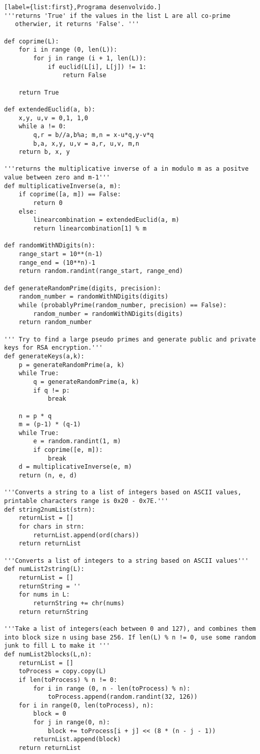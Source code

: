 \documentclass[a4paper,11pt]{article}
\theoremstyle{mytheor}
\begin{document}
\begin{lstlisting}[label={list:first},Programa desenvolvido.]
'''returns 'True' if the values in the list L are all co-prime
   otherwier, it returns 'False'. '''

def coprime(L):
    for i in range (0, len(L)):
        for j in range (i + 1, len(L)):
            if euclid(L[i], L[j]) != 1:
                return False

    return True

def extendedEuclid(a, b):
    x,y, u,v = 0,1, 1,0
    while a != 0:
        q,r = b//a,b%a; m,n = x-u*q,y-v*q
        b,a, x,y, u,v = a,r, u,v, m,n
    return b, x, y

'''returns the multiplicative inverse of a in modulo m as a positve value between zero and m-1'''
def multiplicativeInverse(a, m):
    if coprime([a, m]) == False:
        return 0
    else:
        linearcombination = extendedEuclid(a, m)
        return linearcombination[1] % m

def randomWithNDigits(n):
    range_start = 10**(n-1)
    range_end = (10**n)-1
    return random.randint(range_start, range_end)

def generateRandomPrime(digits, precision):
    random_number = randomWithNDigits(digits)
    while (probablyPrime(random_number, precision) == False):
        random_number = randomWithNDigits(digits)
    return random_number

''' Try to find a large pseudo primes and generate public and private keys for RSA encryption.'''
def generateKeys(a,k):
    p = generateRandomPrime(a, k)
    while True:
        q = generateRandomPrime(a, k)
        if q != p:
            break
    
    n = p * q
    m = (p-1) * (q-1)
    while True:
        e = random.randint(1, m)
        if coprime([e, m]):
            break
    d = multiplicativeInverse(e, m)
    return (n, e, d)

'''Converts a string to a list of integers based on ASCII values, printable characters range is 0x20 - 0x7E.'''
def string2numList(strn):
    returnList = []
    for chars in strn:
        returnList.append(ord(chars))
    return returnList

'''Converts a list of integers to a string based on ASCII values'''
def numList2string(L):
    returnList = []
    returnString = ''
    for nums in L:
        returnString += chr(nums)
    return returnString

'''Take a list of integers(each between 0 and 127), and combines them into block size n using base 256. If len(L) % n != 0, use some random junk to fill L to make it '''
def numList2blocks(L,n):
    returnList = []
    toProcess = copy.copy(L)
    if len(toProcess) % n != 0:
        for i in range (0, n - len(toProcess) % n):
            toProcess.append(random.randint(32, 126))
    for i in range(0, len(toProcess), n):
        block = 0
        for j in range(0, n):
            block += toProcess[i + j] << (8 * (n - j - 1))
        returnList.append(block)
    return returnList


\end{lstlisting}
\end{document}
